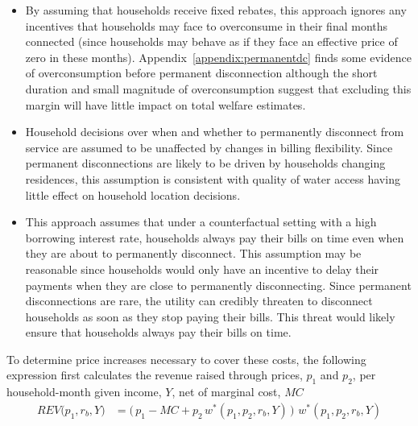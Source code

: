 \documentclass[12pt]{article}
\begin{document}
\begin{enumerate}
\begin{itemize}
    \item By assuming that households receive fixed rebates, this approach ignores any incentives that households may face to overconsume in their final months connected (since households may behave as if they face an effective price of zero in these months).  Appendix~\ref{appendix:permanentdc} finds some evidence of overconsumption before permanent disconnection although the short duration and small magnitude of overconsumption suggest that excluding this margin will have little impact on total welfare estimates.

    \item Household decisions over when and whether to permanently disconnect from service are assumed to be unaffected by changes in billing flexibility.  Since permanent disconnections are likely to be driven by households changing residences, this assumption is consistent with quality of water access having little effect on household location decisions.

    \item This approach assumes that under a counterfactual setting with a high borrowing interest rate, households always pay their bills on time even when they are about to permanently disconnect.  This assumption may be reasonable since households would only have an incentive to delay their payments when they are close to permanently disconnecting.  Since permanent disconnections are rare, the utility can credibly threaten to disconnect households as soon as they stop paying their bills.  This threat would likely ensure that households always pay their bills on time.
\end{itemize}    
\end{enumerate}  

To determine price increases necessary to cover these costs, the following expression first calculates the revenue raised through prices,  $p_1$ and $p_2$, per household-month given income, $Y$, net of marginal cost, $MC$
\begin{align*}
REV \big(p_1,r_b,Y \big) &= \Big ( \,  p_1 - MC +  p_2 \, w^{*}(p_1,p_2,r_b,Y)  \,  \Big ) \, \, w^{*}(p_1,p_2,r_b,Y)
\end{align*}

\end{document}
